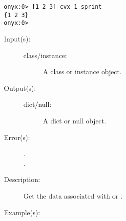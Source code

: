 \begin{description}
\begin{description}
\begin{verbatim}
onyx:0> [1 2 3] cvx 1 sprint
{1 2 3}
onyx:0>
		\end{verbatim}
	\end{description}
\label{systemdict:data}
\item[{\onyxop{class/instance}{data}{dict/null}}: ]
	\begin{description}\item[]
	\item[Input(s): ]
		\begin{description}\item[]
		\item[class/instance: ]
			A class or instance object.
		\end{description}
	\item[Output(s): ]
		\begin{description}\item[]
		\item[dict/null: ]
			A dict or null object.
		\end{description}
	\item[Error(s): ]
		\begin{description}\item[]
		\item[.]
		\item[.]
		\end{description}
	\item[Description: ]
		Get the data associated with  or .
	\item[Example(s): ]\begin{verbatim}


\end{verbatim}
\end{description}
\end{description}
